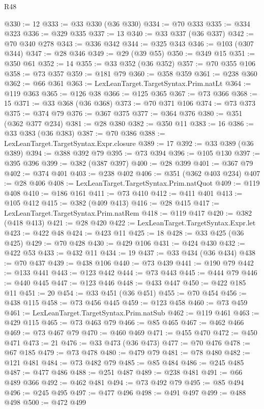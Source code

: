 \begin{lexlean}{R48}
\begin{coremodule}
@330 := 12
@333 := @33 @330 (@36 @330)
@334 := @70 @333
@335 := @334 @323
@336 := @329 @335
@337 := 13
@340 := @33 @337 (@36 @337)
@342 := @70 @340 @278
@343 := @336 @342
@344 := @325 @343
@346 := @103 (@307 @344)
@347 := @28 @346
@349 := @29 (@39 @55)
@350 := @349 @15
@351 := @350 @61
@352 := 14
@355 := @33 @352 (@36 @352)
@357 := @70 @355 @106
@358 := @73 @357
@359 := @181 @79
@360 := @358 @359
@361 := @238 @360
@362 := @66 @361
@363 := LexLeanTarget.TargetSyntax.Prim.natLt
@364 := @119 @363
@365 := @126 @38
@366 := @125 @365
@367 := @73 @366
@368 := 15
@371 := @33 @368 (@36 @368)
@373 := @70 @371 @106
@374 := @73 @373
@375 := @374 @79
@376 := @367 @375
@377 := @364 @376
@380 := @351 (@362 @377 @234)
@381 := @28 @380
@382 := @350 @11
@383 := 16
@386 := @33 @383 (@36 @383)
@387 := @70 @386
@388 := LexLeanTarget.TargetSyntax.Expr.closure
@389 := 17
@392 := @33 @389 (@36 @389)
@394 := @388 @392 @79
@395 := @73 @394
@396 := @105 @130
@397 := @395 @396
@399 := @382 (@387 @397)
@400 := @28 @399
@401 := @367 @79
@402 := @374 @401
@403 := @238 @402
@406 := @351 (@362 @403 @234)
@407 := @28 @406
@408 := LexLeanTarget.TargetSyntax.Prim.natQuot
@409 := @119 @408
@410 := @186 @161
@411 := @73 @410
@412 := @411 @401
@413 := @105 @412
@415 := @382 (@409 @413)
@416 := @28 @415
@417 := LexLeanTarget.TargetSyntax.Prim.natRem
@418 := @119 @417
@420 := @382 (@418 @413)
@421 := @28 @420
@422 := LexLeanTarget.TargetSyntax.Expr.let
@423 := @422 @48
@424 := @423 @11
@425 := 18
@428 := @33 @425 (@36 @425)
@429 := @70 @428
@430 := @429 @106
@431 := @424 @430
@432 := @422 @53
@433 := @432 @11
@434 := 19
@437 := @33 @434 (@36 @434)
@438 := @70 @437
@439 := @438 @106
@440 := @73 @439
@441 := @190 @79
@442 := @133 @441
@443 := @123 @442
@444 := @73 @443
@445 := @444 @79
@446 := @440 @445
@447 := @123 @446
@448 := @433 @447
@450 := @422 @185 @11
@451 := 20
@454 := @33 @451 (@36 @451)
@455 := @70 @454
@456 := @438 @115
@458 := @73 @456 @445
@459 := @123 @458
@460 := @73 @459
@461 := LexLeanTarget.TargetSyntax.Prim.natSub
@462 := @119 @461
@463 := @429 @115
@465 := @73 @463 @79
@466 := @85 @465
@467 := @462 @466
@469 := @73 @467 @79
@470 := @460 @469
@471 := @455 @470
@472 := @450 @471
@473 := 21
@476 := @33 @473 (@36 @473)
@477 := @70 @476
@478 := @67 @185
@479 := @73 @478
@480 := @479 @79
@481 := @78 @480
@482 := @121 @481
@484 := @73 @482 @79
@485 := @85 @484
@486 := @245 @485
@487 := @477 @486
@488 := @251 @487
@489 := @238 @481
@491 := @66 @489 @366
@492 := @462 @481
@494 := @73 @492 @79
@495 := @85 @494
@496 := @245 @495
@497 := @477 @496
@498 := @491 @497
@499 := @488 @498
@500 := @472 @499

\end{coremodule}
\end{lexlean}
